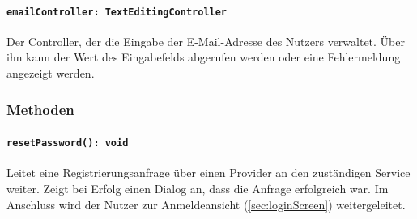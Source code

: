 \documentclass{entwurfsheft}
\begin{document}
\paragraph{\texttt{emailController: TextEditingController}}
Der Controller, der die Eingabe der E-Mail-Ad\-resse des Nutzers verwaltet. Über ihn kann der Wert des Eingabefelds abgerufen werden oder eine Fehlermeldung angezeigt werden.

\subsubsection*{Methoden}
\paragraph{\texttt{resetPassword(): void}}
Leitet eine Registrierungsanfrage über einen Provider an den zuständigen Service weiter. Zeigt bei Erfolg einen \Gls{Dialog} an, dass die Anfrage erfolgreich war. Im Anschluss wird der Nutzer zur Anmeldeansicht (\ref{sec:loginScreen}) weitergeleitet.
\newpage
\end{document}
